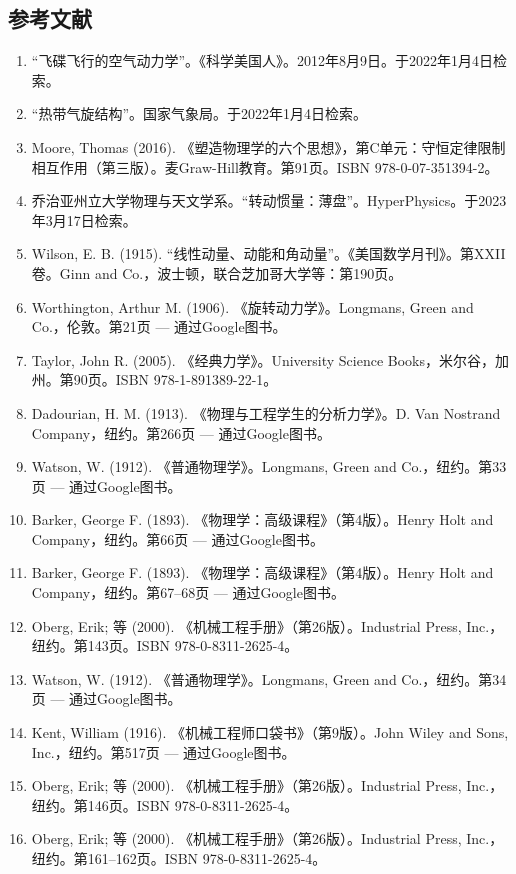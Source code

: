 \subsection{参考文献}
\begin{enumerate}
\item “飞碟飞行的空气动力学”。《科学美国人》。2012年8月9日。于2022年1月4日检索。
\item “热带气旋结构”。国家气象局。于2022年1月4日检索。
\item Moore, Thomas (2016). 《塑造物理学的六个思想》，第C单元：守恒定律限制相互作用（第三版）。麦Graw-Hill教育。第91页。ISBN 978-0-07-351394-2。
\item 乔治亚州立大学物理与天文学系。“转动惯量：薄盘”。HyperPhysics。于2023年3月17日检索。
\item Wilson, E. B. (1915). “线性动量、动能和角动量”。《美国数学月刊》。第XXII卷。Ginn and Co.，波士顿，联合芝加哥大学等：第190页。
\item Worthington, Arthur M. (1906). 《旋转动力学》。Longmans, Green and Co.，伦敦。第21页 — 通过Google图书。
\item Taylor, John R. (2005). 《经典力学》。University Science Books，米尔谷，加州。第90页。ISBN 978-1-891389-22-1。
\item Dadourian, H. M. (1913). 《物理与工程学生的分析力学》。D. Van Nostrand Company，纽约。第266页 — 通过Google图书。
\item Watson, W. (1912). 《普通物理学》。Longmans, Green and Co.，纽约。第33页 — 通过Google图书。
\item Barker, George F. (1893). 《物理学：高级课程》（第4版）。Henry Holt and Company，纽约。第66页 — 通过Google图书。
\item Barker, George F. (1893). 《物理学：高级课程》（第4版）。Henry Holt and Company，纽约。第67–68页 — 通过Google图书。
\item Oberg, Erik; 等 (2000). 《机械工程手册》（第26版）。Industrial Press, Inc.，纽约。第143页。ISBN 978-0-8311-2625-4。
\item Watson, W. (1912). 《普通物理学》。Longmans, Green and Co.，纽约。第34页 — 通过Google图书。
\item Kent, William (1916). 《机械工程师口袋书》（第9版）。John Wiley and Sons, Inc.，纽约。第517页 — 通过Google图书。
\item Oberg, Erik; 等 (2000). 《机械工程手册》（第26版）。Industrial Press, Inc.，纽约。第146页。ISBN 978-0-8311-2625-4。
\item Oberg, Erik; 等 (2000). 《机械工程手册》（第26版）。Industrial Press, Inc.，纽约。第161–162页。ISBN 978-0-8311-2625-4。

\end{enumerate}
